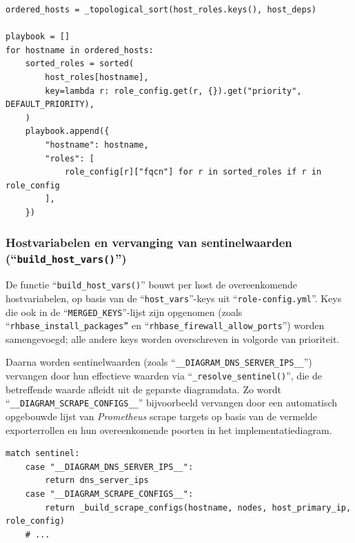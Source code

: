 \begin{codeblockfixed}
  \begin{codeblock}
    \begin{verbatim}
ordered_hosts = _topological_sort(host_roles.keys(), host_deps)

playbook = []
for hostname in ordered_hosts:
    sorted_roles = sorted(
        host_roles[hostname],
        key=lambda r: role_config.get(r, {}).get("priority", DEFAULT_PRIORITY),
    )
    playbook.append({
        "hostname": hostname,
        "roles": [
            role_config[r]["fqcn"] for r in sorted_roles if r in role_config
        ],
    })
\end{verbatim}
    \caption[Opbouw \emph{Ansible}-\emph{playbook} in ``\texttt{build\_playbook()}'']{Topologische sortering van hosts en prioriteitssortering van rollen in ``\texttt{build\_playbook()}''.}
    \label{code:build_playbook}
  \end{codeblock}
\end{codeblockfixed}

\subsubsection{Hostvariabelen en vervanging van sentinelwaarden (``\texttt{build\_host\_vars()}'')}

De functie ``\texttt{build\_host\_vars()}'' bouwt per host de overeenkomende hostvariabelen, op basis van de ``\texttt{host\_vars}''-keys uit ``\texttt{role-config.yml}''. Keys die ook in de ``\texttt{MERGED\_KEYS}''-lijst zijn opgenomen (zoals ``\texttt{rhbase\_install\_packages''} en ``\texttt{rhbase\_firewall\_allow\_ports}'') worden samengevoegd; alle andere keys worden overschreven in volgorde van prioriteit.

Daarna worden sentinelwaarden (zoals ``\texttt{\_\_DIAGRAM\_DNS\_SERVER\_IPS\_\_}'') vervangen door hun effectieve waarden via ``\texttt{\_resolve\_sentinel()}'', die de betreffende waarde afleidt uit de geparste diagramdata. Zo wordt \\``\texttt{\_\_DIAGRAM\_SCRAPE\_CONFIGS\_\_}'' bijvoorbeeld vervangen door een automatisch opgebouwde lijst van \emph{Prometheus} scrape targets op basis van de vermelde exporterrollen en hun overeenkomende poorten in het implementatiediagram.

\begin{codeblockfixed}
  \begin{codeblock}
    \begin{verbatim}
match sentinel:
    case "__DIAGRAM_DNS_SERVER_IPS__":
        return dns_server_ips
    case "__DIAGRAM_SCRAPE_CONFIGS__":
        return _build_scrape_configs(hostname, nodes, host_primary_ip, role_config)
    # ...
\end{verbatim}
    \caption[Vervanging van sentinelwaarden in ``\texttt{\_resolve\_sentinel()}'']{Vervanging van sentinelwaarden door diagramafhankelijke waarden in ``\texttt{\_resolve\_sentinel()}''.}
    \label{code:resolve_sentinel}
  \end{codeblock}
\end{codeblockfixed}